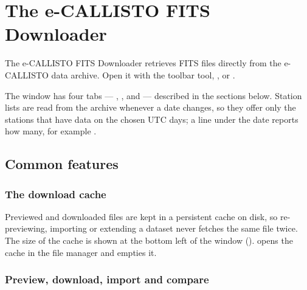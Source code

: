 \chapter{The e-CALLISTO FITS Downloader}
\label{ch:downloader}

The e-CALLISTO FITS Downloader retrieves FITS files directly from the e-CALLISTO data
archive. Open it with the  toolbar tool, , or .

The window has four tabs --- , ,
 and  --- described in the sections below. Station
lists are read from the archive whenever a date changes, so they offer only the stations
that have data on the chosen UTC days; a line under the date reports how many, for example
.

\section{Common features}

\subsection{The download cache}

Previewed and downloaded files are kept in a persistent cache on disk, so re-previewing,
importing or extending a dataset never fetches the same file twice. The size of the cache is
shown at the bottom left of the window ().  opens the
cache in the file manager and  empties it.

\subsection{Preview, download, import and compare}

